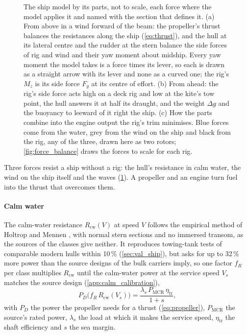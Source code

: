 \begin{figure}[tbp]
\centering

\caption{The ship model by its parts, not to scale, each force where the model applies it and named with the section that defines it. (a) From above in a wind forward of the beam: the propeller's thrust balances the resistances along the ship (\cref{eq:thrust}), and the hull at its lateral centre and the rudder at the stern balance the side forces of rig and wind and their yaw moment about midship. Every yaw moment the model takes is a force times its lever, so each is drawn as a straight arrow with its lever and none as a curved one; the rig's $M_z$ is its side force $F_y$ at its centre of effort. (b) From ahead: the rig's side force acts high on a deck rig and low at the kite's tow point, the hull answers it at half its draught, and the weight $\Delta g$ and the buoyancy to leeward of it right the ship. (c) How the parts combine into the engine output the rig's trim minimises. Blue forces come from the water, grey from the wind on the ship and black from the rig, any of the three, drawn here as two rotors; \cref{fig:force_balance} draws the forces to scale for each rig.}
\label{fig:ship_model}
\end{figure}

Three forces resist a ship without a rig: the hull's resistance in calm water, the wind on the ship itself and the waves (\cref{fig:ship_model}). A propeller and an engine turn fuel into the thrust that overcomes them.

\paragraph{Calm water} The calm-water resistance $R_\mathrm{cw}(V)$ at speed $V$ follows the empirical method of Holtrop and Mennen \citep{holtrop1982,holtrop1984}, with normal stern sections and no immersed transom, as the sources of the classes give neither. It reproduces towing-tank tests of comparable modern hulls within 10\,\% (\cref{sec:val_ship}), but asks for up to 32\,\% more power than the source designs of the bulk carriers imply, so one factor $f_R$ per class multiplies $R_\mathrm{cw}$ until the calm-water power at the service speed $V_s$ matches the source design (\cref{app:calm_calibration}),
\begin{equation}
P_D\bigl(f_R\,R_\mathrm{cw}(V_s)\bigr) = \frac{\lambda_s\,P_\mathrm{MCR}\,\eta_\mathrm{tr}}{1+s},
\label{eq:calm_calibration}
\end{equation}
with $P_D$ the power the propeller needs for a thrust (\cref{eq:propeller}), $P_\mathrm{MCR}$ the source's rated power, $\lambda_s$ the load at which it makes the service speed, $\eta_\mathrm{tr}$ the shaft efficiency and $s$ the sea margin.

